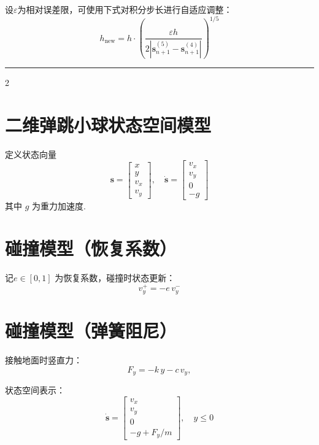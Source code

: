 \documentclass{ctexart}
\begin{document}
设$\varepsilon$为相对误差限，可使用下式对积分步长进行自适应调整：
\[
    h_{\text{new}} = h\cdot\left(\frac{\varepsilon h}{2\left|\boldsymbol{s}_{n+1}^{(5)}-\boldsymbol{s}_{n+1}^{(4)}\right|}\right)^{1/5}
\]
\rule{\linewidth}{0.4pt}
\begin{multicols}{2}
    \section*{二维弹跳小球状态空间模型}

    定义状态向量
    \begin{equation*}
        \boldsymbol{s} =
        \begin{bmatrix}
            x \\ y \\ v_x \\ v_y
        \end{bmatrix},
        \quad
        \dot{\boldsymbol{s}} =
        \begin{bmatrix}
            v_x \\ v_y \\ 0 \\ -g
        \end{bmatrix}
    \end{equation*}
    其中 $g$ 为重力加速度.

    \section*{碰撞模型（恢复系数）}

    记$e \in [0,1]$ 为恢复系数，碰撞时状态更新：
    \[
        v_y^+ = -e\, v_y^-
    \]

    \section*{碰撞模型（弹簧阻尼）}

    接触地面时竖直力：
    \[
        F_y = -k\,y - c\,v_y,
    \]

    状态空间表示：
    \[
        \dot{\boldsymbol{s}} =
        \begin{bmatrix}
            v_x \\ v_y \\ 0 \\ -g + F_y/m
        \end{bmatrix}, \quad y \le 0
    \]
\end{multicols}
\end{document}
